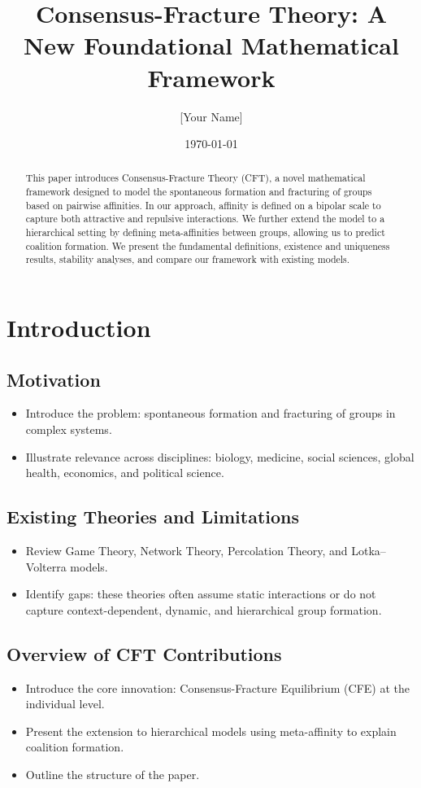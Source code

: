 \documentclass{article}
\begin{document}
\title{Consensus-Fracture Theory: A New Foundational Mathematical Framework}
\author{[Your Name]}
\date{\today}
\maketitle

\begin{abstract}
This paper introduces Consensus-Fracture Theory (CFT), a novel mathematical framework designed to model the spontaneous formation and fracturing of groups based on pairwise affinities. In our approach, affinity is defined on a bipolar scale to capture both attractive and repulsive interactions. We further extend the model to a hierarchical setting by defining meta-affinities between groups, allowing us to predict coalition formation. We present the fundamental definitions, existence and uniqueness results, stability analyses, and compare our framework with existing models.
\end{abstract}

\section{Introduction}
\subsection{Motivation}
\begin{itemize}
  \item Introduce the problem: spontaneous formation and fracturing of groups in complex systems.
  \item Illustrate relevance across disciplines: biology, medicine, social sciences, global health, economics, and political science.
\end{itemize}

\subsection{Existing Theories and Limitations}
\begin{itemize}
  \item Review Game Theory, Network Theory, Percolation Theory, and Lotka--Volterra models.
  \item Identify gaps: these theories often assume static interactions or do not capture context-dependent, dynamic, and hierarchical group formation.
\end{itemize}

\subsection{Overview of CFT Contributions}
\begin{itemize}
  \item Introduce the core innovation: Consensus-Fracture Equilibrium (CFE) at the individual level.
  \item Present the extension to hierarchical models using meta-affinity to explain coalition formation.
  \item Outline the structure of the paper.
\end{itemize}
\end{document}

